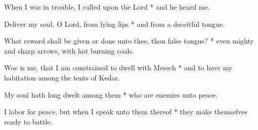 When I was in trouble, I called upon the Lord * and he heard me.

Deliver my soul, O Lord, from lying lips * and from a deceitful tongue.

What reward shall be given or done unto thee, thou false tongue? * even mighty and sharp arrows, with hot burning coals.

Woe is me, that I am constrained to dwell with Mesech * and to have my habitation among the tents of Kedar.

My soul hath long dwelt among them * who are enemies unto peace.

I labor for peace, but when I speak unto them thereof * they make themselves ready to battle.